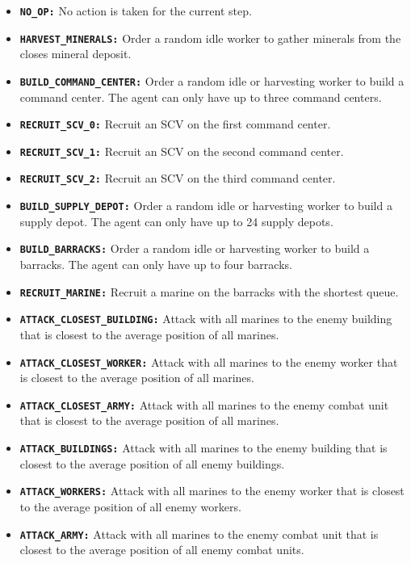 \begin{itemize}
    \item \textbf{\texttt{NO\_OP:}} No action is taken for the current step.
    \item \textbf{\texttt{HARVEST\_MINERALS:}} Order a random idle worker to gather minerals from the closes mineral deposit.
    \item \textbf{\texttt{BUILD\_COMMAND\_CENTER:}} Order a random idle or harvesting worker to build a command center. The agent can only have up to three command centers.
    \item \textbf{\texttt{RECRUIT\_SCV\_0:}} Recruit an SCV on the first command center.
    \item \textbf{\texttt{RECRUIT\_SCV\_1:}} Recruit an SCV on the second command center.
    \item \textbf{\texttt{RECRUIT\_SCV\_2:}} Recruit an SCV on the third command center.
    \item \textbf{\texttt{BUILD\_SUPPLY\_DEPOT:}} Order a random idle or harvesting worker to build a supply depot. The agent can only have up to 24 supply depots.
    \item \textbf{\texttt{BUILD\_BARRACKS:}} Order a random idle or harvesting worker to build a barracks. The agent can only have up to four barracks.
    \item \textbf{\texttt{RECRUIT\_MARINE:}} Recruit a marine on the barracks with the shortest queue.
    \item \textbf{\texttt{ATTACK\_CLOSEST\_BUILDING:}} Attack with all marines to the enemy building that is closest to the average position of all marines.
    \item \textbf{\texttt{ATTACK\_CLOSEST\_WORKER:}} Attack with all marines to the enemy worker that is closest to the average position of all marines.
    \item \textbf{\texttt{ATTACK\_CLOSEST\_ARMY:}} Attack with all marines to the enemy combat unit that is closest to the average position of all marines.
    \item \textbf{\texttt{ATTACK\_BUILDINGS:}} Attack with all marines to the enemy building that is closest to the average position of all enemy buildings.
    \item \textbf{\texttt{ATTACK\_WORKERS:}} Attack with all marines to the enemy worker that is closest to the average position of all enemy workers.
    \item \textbf{\texttt{ATTACK\_ARMY:}} Attack with all marines to the enemy combat unit that is closest to the average position of all enemy combat units.
\end{itemize}


